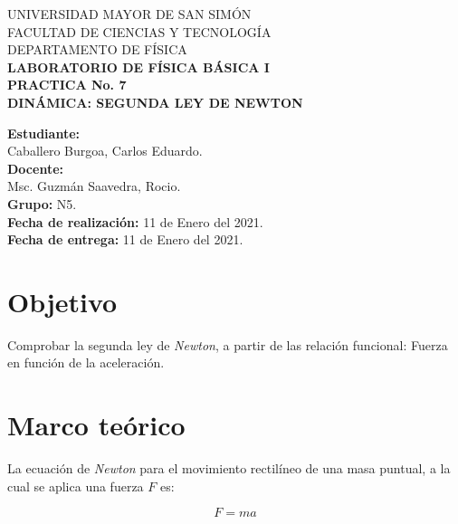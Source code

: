 \documentclass[letter,11pt]{article}
\newcommand{\blankpage}{
\newpage
\thispagestyle{empty}
\mbox{}
\newpage
}
\begin{document}
\begin{titlepage}
\begin{center}
{\Large UNIVERSIDAD MAYOR DE SAN SIMÓN}\\
\vspace*{0.15cm}
{\large FACULTAD DE CIENCIAS Y TECNOLOGÍA}\\
\vspace*{0.10cm}
DEPARTAMENTO DE FÍSICA\\
\vspace*{3.0cm}
{\Large \textbf{LABORATORIO DE FÍSICA BÁSICA I}}\\
\vspace*{0.3cm}
{\Large \textbf{PRACTICA No. 7}}\\
\vspace*{3.5cm}
{\Large \textbf{DINÁMICA: SEGUNDA LEY DE NEWTON}}\\
\end{center}

\vspace*{7.4cm}
\leftskip=7.95cm
\noindent
\textbf{Estudiante:}\\
Caballero Burgoa, Carlos Eduardo.\\
\newline
\textbf{Docente:}\\
Msc. Guzmán Saavedra, Rocio.\\
\newline
\textbf{Grupo:} N5.\\
\textbf{Fecha de realización:} 11 de Enero del 2021.\\
\textbf{Fecha de entrega:} 11 de Enero del 2021.\\

\end{titlepage}

\blankpage

\section{Objetivo}
Comprobar la segunda ley de \emph{Newton}, a partir de las relación funcional:
Fuerza en función de la aceleración.

\section{Marco teórico}
La ecuación de \emph{Newton} para el movimiento rectilíneo de una masa puntual,
a la cual se aplica una fuerza $F$ es:

\begin{equation*}
    F = m a
\end{equation*}
\end{document}
